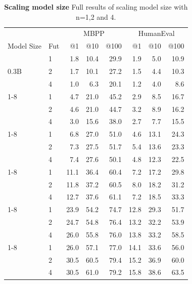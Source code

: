 \begin{table}[ht!]
    \centering
\caption{\textbf{Scaling model size} Full results of scaling model size with n=1,2 and 4.}
\label{tab:model_scaling}
\begin{tabular}{llrrrrrr}
\toprule
 &  & \multicolumn{3}{c}{MBPP} & \multicolumn{3}{c}{HumanEval} \\
Model Size & Fut & @1 & @10 & @100 & @1 & @10 & @100 \\
\midrule
\multirow[c]{3}{*}{0.3B} & 1 & 1.8 & 10.4 & 29.9 & 1.9 & 5.0 & 10.9 \\
 & 2 & 1.7 & 10.1 & 27.2 & 1.5 & 4.4 & 10.3 \\
 & 4 & 1.0 & 6.3 & 20.1 & 1.2 & 4.0 & 8.6 \\
\cmidrule{1-8}
\multirow[c]{3}{*}{0.6B} & 1 & 4.7 & 21.0 & 45.2 & 2.9 & 8.5 & 16.7 \\
 & 2 & 4.6 & 21.0 & 44.7 & 3.2 & 8.9 & 16.2 \\
 & 4 & 3.0 & 15.6 & 38.0 & 2.7 & 7.7 & 15.5 \\
\cmidrule{1-8}
\multirow[c]{3}{*}{1.3B} & 1 & 6.8 & 27.0 & 51.0 & 4.6 & 13.1 & 24.3 \\
 & 2 & 7.3 & 27.5 & 51.7 & 5.4 & 13.6 & 23.3 \\
 & 4 & 7.4 & 27.6 & 50.1 & 4.8 & 12.3 & 22.5 \\
\cmidrule{1-8}
\multirow[c]{3}{*}{3B} & 1 & 11.1 & 36.4 & 60.4 & 7.2 & 17.2 & 29.8 \\
 & 2 & 11.8 & 37.2 & 60.5 & 8.0 & 18.2 & 31.2 \\
 & 4 & 12.7 & 37.6 & 61.1 & 7.2 & 18.5 & 33.3 \\
\cmidrule{1-8}
\multirow[c]{3}{*}{6.7B} & 1 & 23.9 & 54.2 & 74.7 & 12.8 & 29.3 & 51.7 \\
 & 2 & 24.7 & 54.8 & 76.4 & 13.2 & 32.2 & 53.9 \\
 & 4 & 26.0 & 55.8 & 76.0 & 13.8 & 33.2 & 58.5 \\
\cmidrule{1-8}
\multirow[c]{3}{*}{13B} & 1 & 26.0 & 57.1 & 77.0 & 14.1 & 33.6 & 56.0 \\
 & 2 & 30.5 & 60.5 & 79.4 & 15.2 & 36.9 & 60.0 \\
 & 4 & 30.5 & 61.0 & 79.2 & 15.8 & 38.6 & 63.5 \\
\bottomrule
\end{tabular}
\end{table}
